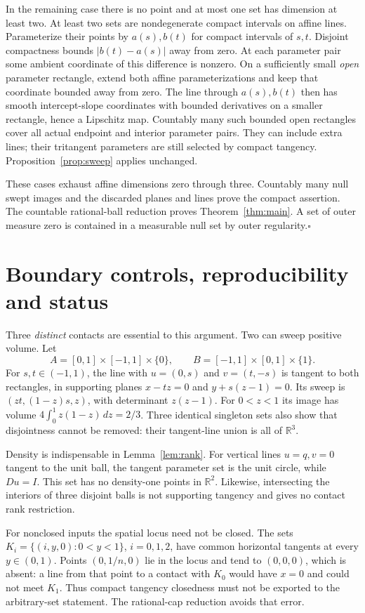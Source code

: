 \documentclass[11pt]{article}
\newcommand{\R}{\mathbb R}
\theoremstyle{remark}
\begin{document}
In the remaining case there is no point and at most one set has dimension at least two. At least two sets are nondegenerate compact intervals on affine lines. Parameterize their points by $a(s),b(t)$ for compact intervals of $s,t$. Disjoint compactness bounds $|b(t)-a(s)|$ away from zero. At each parameter pair some ambient coordinate of this difference is nonzero. On a sufficiently small \emph{open} parameter rectangle, extend both affine parameterizations and keep that coordinate bounded away from zero. The line through $a(s),b(t)$ then has smooth intercept-slope coordinates with bounded derivatives on a smaller rectangle, hence a Lipschitz map. Countably many such bounded open rectangles cover all actual endpoint and interior parameter pairs. They can include extra lines; their tritangent parameters are still selected by compact tangency. Proposition~\ref{prop:sweep} applies unchanged.

These cases exhaust affine dimensions zero through three. Countably many null swept images and the discarded planes and lines prove the compact assertion. The countable rational-ball reduction proves Theorem~\ref{thm:main}. A set of outer measure zero is contained in a measurable null set by outer regularity.\hfill$\square$

\section{Boundary controls, reproducibility and status}
Three \emph{distinct} contacts are essential to this argument. Two can sweep positive volume. Let
\[
A=[0,1]\times[-1,1]\times\{0\},\qquad
B=[-1,1]\times[0,1]\times\{1\}.
\]
For $s,t\in(-1,1)$, the line with $u=(0,s)$ and $v=(t,-s)$ is tangent to both rectangles, in supporting planes $x-tz=0$ and $y+s(z-1)=0$. Its sweep is $(zt,(1-z)s,z)$, with determinant $z(z-1)$. For $0<z<1$ its image has volume $4\int_0^1 z(1-z)\,dz=2/3$. Three identical singleton sets also show that disjointness cannot be removed: their tangent-line union is all of $\R^3$.

Density is indispensable in Lemma~\ref{lem:rank}. For vertical lines $u=q,v=0$ tangent to the unit ball, the tangent parameter set is the unit circle, while $Du=I$. This set has no density-one points in $\R^2$. Likewise, intersecting the interiors of three disjoint balls is not supporting tangency and gives no contact rank restriction.

For nonclosed inputs the spatial locus need not be closed. The sets $K_i=\{(i,y,0):0<y<1\}$, $i=0,1,2$, have common horizontal tangents at every $y\in(0,1)$. Points $(0,1/n,0)$ lie in the locus and tend to $(0,0,0)$, which is absent: a line from that point to a contact with $K_0$ would have $x=0$ and could not meet $K_1$. Thus compact tangency closedness must not be exported to the arbitrary-set statement. The rational-cap reduction avoids that error.
\end{document}
